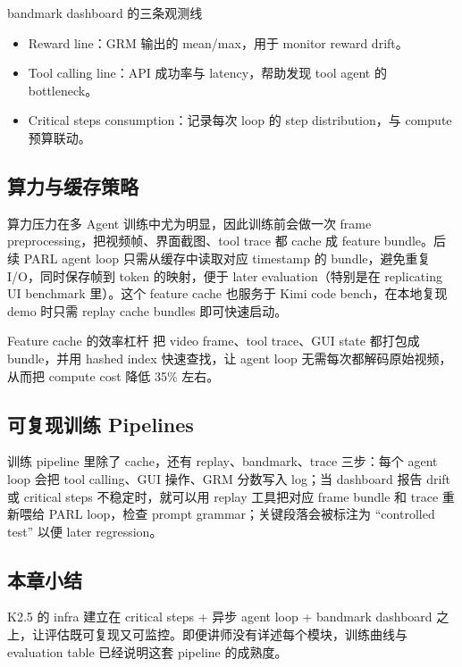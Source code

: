 \begin{knowledgebox}{bandmark dashboard 的三条观测线}
\begin{itemize}
    \item Reward line：GRM 输出的 mean/max，用于 monitor reward drift。
    \item Tool calling line：API 成功率与 latency，帮助发现 tool agent 的 bottleneck。
    \item Critical steps consumption：记录每次 loop 的 step distribution，与 compute 预算联动。
\end{itemize}
\end{knowledgebox}

\subsection{算力与缓存策略}
算力压力在多 Agent 训练中尤为明显，因此训练前会做一次 frame preprocessing，把视频帧、界面截图、tool trace 都 cache 成 feature bundle。后续 PARL agent loop 只需从缓存中读取对应 timestamp 的 bundle，避免重复 I/O，同时保存帧到 token 的映射，便于 later evaluation（特别是在 replicating UI benchmark 里）。这个 feature cache 也服务于 Kimi code bench，在本地复现 demo 时只需 replay cache bundles 即可快速启动。

\begin{importantbox}{Feature cache 的效率杠杆}
把 video frame、tool trace、GUI state 都打包成 bundle，并用 hashed index 快速查找，让 agent loop 无需每次都解码原始视频，从而把 compute cost 降低 35\% 左右。
\end{importantbox}

\subsection{可复现训练 Pipelines}
训练 pipeline 里除了 cache，还有 replay、bandmark、trace 三步：每个 agent loop 会把 tool calling、GUI 操作、GRM 分数写入 log；当 dashboard 报告 drift 或 critical steps 不稳定时，就可以用 replay 工具把对应 frame bundle 和 trace 重新喂给 PARL loop，检查 prompt grammar；关键段落会被标注为 ``controlled test'' 以便 later regression。

\subsection{本章小结}
K2.5 的 infra 建立在 critical steps + 异步 agent loop + bandmark dashboard 之上，让评估既可复现又可监控。即便讲师没有详述每个模块，训练曲线与 evaluation table 已经说明这套 pipeline 的成熟度。
